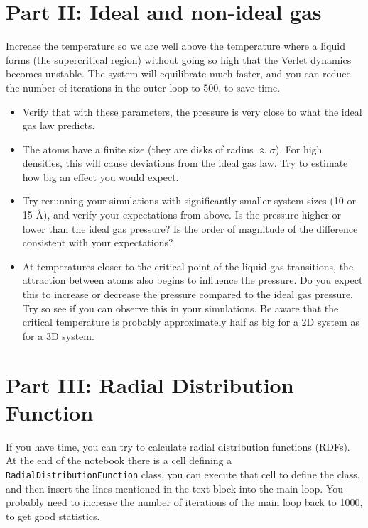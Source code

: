 \documentclass[a4paper,11pt]{article}
\begin{document}
\section{Part II: Ideal and non-ideal gas}
\label{sec:part-ii}

Increase the temperature so we are well above the temperature where a
liquid forms (the supercritical region) without going so high that the
Verlet dynamics becomes unstable.  The system will equilibrate much
faster, and you can reduce the number of iterations in the outer loop
to 500, to save time.

\begin{itemize}
\item Verify that with these parameters, the pressure is very close to
  what the ideal gas law predicts.
\item The atoms have a finite size (they are disks of radius $\approx
  \sigma$).  For high densities, this will cause deviations from the
  ideal gas law.  Try to estimate how big an effect you would expect.
\item Try rerunning your simulations with significantly smaller system
  sizes (10 or 15 Å), and verify your expectations from above.  Is the
  pressure higher or lower than the ideal gas pressure?  Is the order
  of magnitude of the difference consistent with your expectations?
\item At temperatures closer to the critical point of the liquid-gas
  transitions, the attraction between atoms also begins to influence
  the pressure.  Do you expect this to increase or decrease the
  pressure compared to the ideal gas pressure.  Try so see if you can
  observe this in your simulations.  Be aware that the critical
  temperature is probably approximately half as big for a 2D system as
  for a 3D system.
\end{itemize}

\section{Part III: Radial Distribution Function}

If you have time, you can try to calculate radial distribution
functions (RDFs).  At the end of the notebook there is a cell defining
a \texttt{RadialDistributionFunction} class, you can execute that cell
to define the class, and then insert the lines mentioned in the text
block into the main loop.  You probably need to increase the number of
iterations of the main loop back to 1000, to get good statistics.
\end{document}
